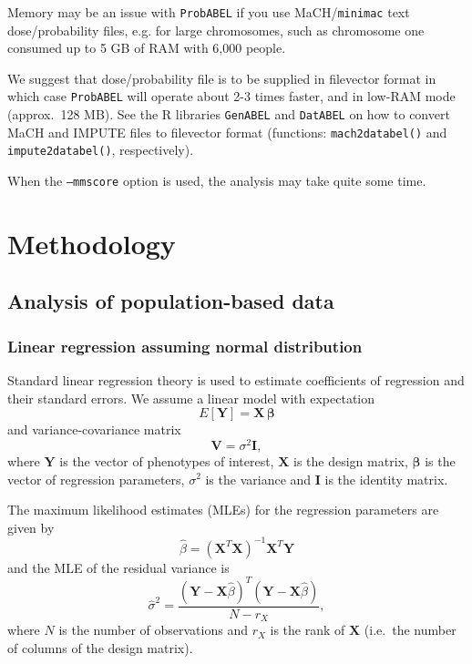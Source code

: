 \documentclass[12pt,a4paper]{article}
\newcommand{\PA}{\texttt{ProbABEL}}
\newcommand{\GA}{\texttt{GenABEL}}
\newcommand{\DA}{\texttt{DatABEL}}
\begin{document}
Memory may be an issue with \PA{} if you use MaCH/\texttt{minimac}
text dose/probability files, e.g. for large chromosomes, such as
chromosome one consumed up to 5 GB of RAM with 6,000 people.

We suggest that dose/probability file is to be supplied in filevector format
in which case \PA{} will operate about 2-3 times faster, and
in low-RAM mode (approx.~128 MB). See the R libraries \GA{} and
\DA{} on how to convert MaCH and IMPUTE files to
filevector format (functions: \texttt{mach2databel()} and
\texttt{impute2databel()}, respectively).

When the \texttt{--mmscore} option is used, the analysis may take
quite some time.

\section{Methodology}
\label{sec:methodology}
\subsection{Analysis of population-based data}
\subsubsection{Linear regression assuming normal distribution}
Standard linear regression theory is used to estimate coefficients of
regression and their standard errors. We assume a linear model with
expectation
\begin{equation}
  E[\mathbf{Y}] = \mathbf{X}\, \boldsymbol{\beta}
\label{eq:expectation}
\end{equation}
and variance-covariance matrix
$$
\mathbf{V} = \sigma^2 \mathbf{I},
$$
where $\mathbf{Y}$ is the vector of phenotypes of interest,
$\mathbf{X}$ is the design matrix, $\boldsymbol{\beta}$ is the vector
of regression parameters, $\sigma^2$ is the variance and $\mathbf{I}$
is the identity matrix.

The maximum likelihood estimates (MLEs) for the regression parameters
are given by
\begin{equation}
  \hat{\beta} = (\mathbf{X}^T \mathbf{X})^{-1} \mathbf{X}^T \mathbf{Y}
\end{equation}
and the MLE of the residual variance is
\begin{equation}
  \hat{\sigma}^2 = \frac{(\mathbf{Y} - \mathbf{X}\hat{\beta})^T
    (\mathbf{Y} - \mathbf{X}\hat{\beta})} {N-r_X},
\end{equation}
where $N$ is the number of observations and $r_X$ is the rank of
$\mathbf{X}$ (i.e.~the number of columns of the design matrix).
\end{document}
